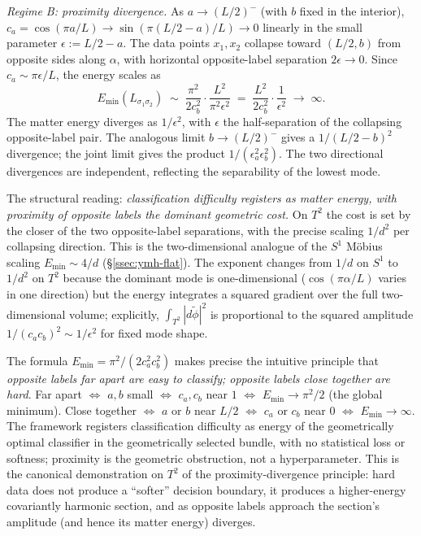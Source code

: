 \emph{Regime B: proximity divergence.} As $a\to (L/2)^-$ (with
$b$ fixed in the interior), $c_a=\cos(\pi a/L)\to\sin(\pi(L/2-a)/L)
\to 0$ linearly in the small parameter $\epsilon:=L/2-a$. The data
points $x_1, x_2$ collapse toward $(L/2,b)$ from opposite sides
along $\alpha$, with horizontal opposite-label separation
$2\epsilon\to 0$. Since $c_a\sim\pi\epsilon/L$, the energy scales
as
\[
   E_{\min}(L_{\sigma_1\sigma_2}) \;\sim\;
   \frac{\pi^2}{2 c_b^2}\cdot\frac{L^2}{\pi^2\epsilon^2}
   \;=\; \frac{L^2}{2 c_b^2}\cdot\frac{1}{\epsilon^2}
   \;\longrightarrow\;\infty.
\]
The matter energy diverges as $1/\epsilon^2$, with $\epsilon$ the
half-separation of the collapsing opposite-label pair. The
analogous limit $b\to(L/2)^-$ gives a $1/(L/2-b)^2$ divergence; the
joint limit gives the product $1/(\epsilon_a^2\epsilon_b^2)$. The
two directional divergences are independent, reflecting the
separability of the lowest mode.

The structural reading: \emph{classification difficulty registers
as matter energy, with proximity of opposite labels the dominant
geometric cost.} On $T^2$ the cost is set by the closer of the two
opposite-label separations, with the precise scaling $1/d^2$ per
collapsing direction. This is the two-dimensional analogue of the
$S^1$ M\"obius scaling $E_{\min}\sim 4/d$ (\S\ref{ssec:ymh-flat}).
The exponent changes from $1/d$ on $S^1$ to $1/d^2$ on $T^2$
because the dominant mode is one-dimensional ($\cos(\pi\alpha/L)$
varies in one direction) but the energy integrates a squared
gradient over the full two-dimensional volume; explicitly,
$\int_{T^2}|d\tilde\phi|^2$ is proportional to the squared
amplitude $1/(c_a c_b)^2 \sim 1/\epsilon^2$ for fixed mode shape.

\begin{remark}\label{rem:T2-proximity}
The formula $E_{\min}=\pi^2/(2 c_a^2 c_b^2)$ makes precise the
intuitive principle that \emph{opposite labels far apart are easy
to classify; opposite labels close together are hard}. Far apart
$\Leftrightarrow$ $a,b$ small $\Leftrightarrow$ $c_a,c_b$ near $1$
$\Leftrightarrow$ $E_{\min}\to \pi^2/2$ (the global minimum). Close
together $\Leftrightarrow$ $a$ or $b$ near $L/2$
$\Leftrightarrow$ $c_a$ or $c_b$ near $0$ $\Leftrightarrow$
$E_{\min}\to\infty$. The framework registers classification
difficulty as energy of the geometrically optimal classifier in the
geometrically selected bundle, with no statistical loss or
softness; proximity is the geometric obstruction, not a
hyperparameter. This is the canonical demonstration on $T^2$ of the
proximity-divergence principle: hard data does not produce a
``softer'' decision boundary, it produces a higher-energy
covariantly harmonic section, and as opposite labels approach the
section's amplitude (and hence its matter energy) diverges.
\end{remark}

